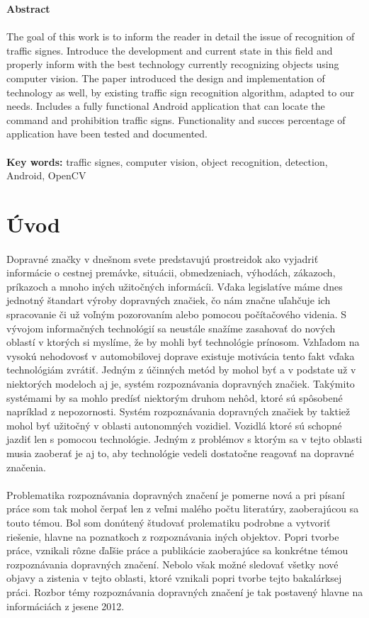 \documentclass[12pt]{article}
\begin{document}
\centerline{\textbf{Abstract}}
\paragraph{}
The goal of this work is to inform the reader in detail the issue of recognition of traffic signes. Introduce the development and current state in this field and properly inform with the best technology currently recognizing objects using computer vision. The paper introduced the design and implementation of technology as well, by existing traffic sign recognition algorithm, adapted to our needs. Includes a fully functional Android application that can locate the command and prohibition traffic signs. Functionality and succes percentage of application have been tested and documented.
\\\\
\textbf{Key words:} traffic signes, computer vision, object recognition, detection, Android, OpenCV
\clearpage
\section*{Úvod}
\paragraph{}
Dopravné značky v dnešnom svete predstavujú prostreidok ako vyjadriť informácie o cestnej premávke, situácii, obmedzeniach, výhodách, zákazoch, príkazoch a mnoho iných užitočných informácíi. Vďaka legislatíve máme dnes jednotný štandart výroby dopravných značiek, čo nám značne uľahčuje ich spracovanie či už voľným pozorovaním alebo pomocou počítačového videnia. S vývojom informačných technológií sa neustále snažíme zasahovať do nových oblastí v ktorých si myslíme, že by mohli byť technológie prínosom. Vzhľadom na vysokú nehodovosť v automobilovej doprave existuje motivácia  tento fakt vďaka technológiám zvrátiť. Jedným z účinných metód by mohol byť a v podstate už v niektorých modeloch aj je, systém rozpoznávania dopravných značiek. Takýmito systémami by sa mohlo predísť niektorým druhom nehôd, ktoré sú spôsobené napríklad z nepozornosti. Systém rozpoznávania dopravných značiek by taktiež mohol byť užitočný v oblasti autonomných vozidiel. Vozidlá ktoré sú schopné jazdiť len s pomocou technológie. Jedným z problémov s ktorým sa v tejto oblasti musia zaoberať je aj to, aby technológie vedeli dostatočne reagovať na dopravné značenia.
\paragraph{}
Problematika rozpoznávania dopravných značení je pomerne nová a pri písaní práce som tak mohol čerpať len z veľmi malého počtu literatúry, zaoberajúcou sa touto témou.
Bol som donútený študovať prolematiku podrobne a vytvoriť riešenie, hlavne na poznatkoch z rozpoznávania iných objektov.
Popri tvorbe práce, vznikali rôzne ďaľšie práce a publikácie zaoberajúce sa konkrétne témou rozpoznávania dopravných značení.
Nebolo však možné sledovať všetky nové objavy a zistenia v tejto oblasti, ktoré vznikali popri tvorbe tejto bakalárksej práci.
Rozbor témy rozpoznávania dopravných značení je tak postavený hlavne na informáciách z jesene 2012.
\end{document}
